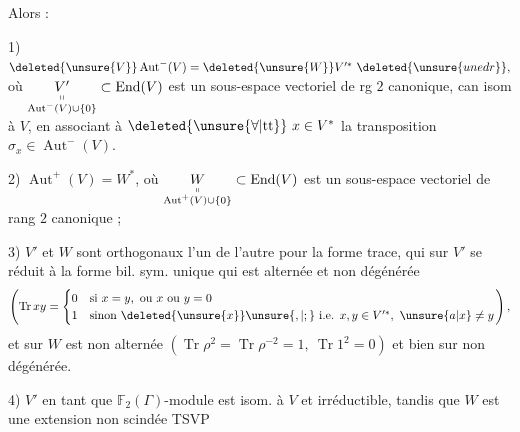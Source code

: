 Alors :

1) \(\deleted{\unsure{V}}\operatorname{Aut}^{-}(V)=\deleted{\unsure{W}}V'^{*}\ \deleted{\unsure{une dr}},\) où
\(\underset{\substack{\shortparallel\\\operatorname{Aut}^{-}(V)\cup\{0\}}}{V'}\subset\operatorname{End}(V)\)
est un sous-espace vectoriel de rg \(2\) canonique, can isom à \(V\), en associant à \(\deleted{\unsure{\forall|\mathrm{tt}}}\ x\in V^*\) la transposition \(\sigma_x\in\operatorname{Aut}^{-}(V)\).

2) \(\operatorname{Aut}^{+}(V)=W^{*}\), où
\(\underset{\substack{\shortparallel\\\operatorname{Aut}^{+}(V)\cup\{0\}}}{W}\subset\operatorname{End}(V)\)
est un sous-espace vectoriel de rang \(2\) canonique ;

3) \(V'\) et \(W\) sont orthogonaux l'un de l'autre pour la forme trace, qui sur \(V'\) se réduit à la forme bil. sym. unique qui est alternée et non dégénérée
\[
\left(\operatorname{Tr}xy=
\begin{cases}
0 & \text{si }x=y,\ \text{ou }x\ \text{ou }y=0\\
1 & \text{sinon}\ \deleted{\unsure{x}}\unsure{,|;}\ \text{i.e. }x,y\in V'^{*},\ \unsure{a|x}\ne y
\end{cases}\right),
\]
et sur \(W\) est non alternée \((\operatorname{Tr}\rho^2=\operatorname{Tr}\rho^{-2}=1,\ \operatorname{Tr}1^2=0)\)
et bien sur non dégénérée.


4) \(V'\)  en tant que \(\mathbb F_2(\Gamma)\)-module est isom. à \(V\) et irréductible, tandis que \(W\) est une extension non scindée
\hfill TSVP

